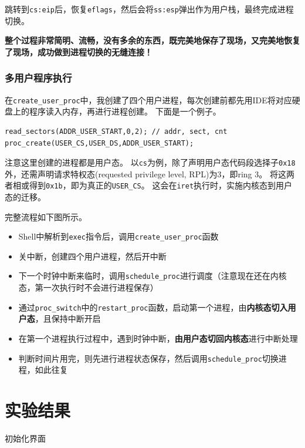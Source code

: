 \documentclass[logo,reportComp]{thesis}
\begin{document}
跳转到\verb'cs:eip'后，恢复\verb'eflags'，然后会将\verb'ss:esp'弹出作为用户栈，最终完成进程切换。

\textbf{整个过程非常简明、流畅，没有多余的东西，既完美地保存了现场，又完美地恢复了现场，成功做到进程切换的无缝连接！}

\subsubsection{多用户程序执行}
在\verb'create_user_proc'中，我创建了四个用户进程，每次创建前都先用IDE将对应硬盘上的程序读入内存，再进行进程创建。
下面是一个例子。
\begin{lstlisting}
read_sectors(ADDR_USER_START,0,2); // addr, sect, cnt
proc_create(USER_CS,USER_DS,ADDR_USER_START);
\end{lstlisting}

注意这里创建的进程都是用户态。
以\verb'cs'为例，除了声明用户态代码段选择子\verb'0x18'外，还需声明请求特权态(requested privilege level, RPL)为3，即ring 3。
将这两者相或得到\verb'0x1b'，即为真正的\verb'USER_CS'。
这会在\verb'iret'执行时，实施内核态到用户态的迁移。

完整流程如下图所示。

\begin{itemize}
	\item Shell中解析到\verb'exec'指令后，调用\verb'create_user_proc'函数
	\item 关中断，创建四个用户进程，然后开中断
	\item 下一个时钟中断来临时，调用\verb'schedule_proc'进行调度（注意现在还在内核态，第一次执行时不会进行进程保存）
	\item 通过\verb'proc_switch'中的\verb'restart_proc'函数，启动第一个进程，由\textbf{内核态切入用户态}，且保持中断开启
	\item 在第一个进程执行过程中，遇到时钟中断，\textbf{由用户态切回内核态}进行中断处理
	\item 判断时间片用完，则先进行进程状态保存，然后调用\verb'schedule_proc'切换进程，如此往复
\end{itemize}

\section{实验结果}
初始化界面
\end{document}

